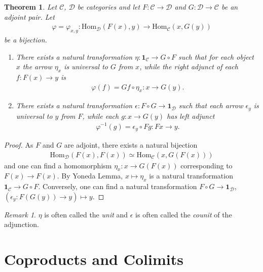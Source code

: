 \documentclass[12pt]{report}
\theoremstyle{plain}
\newtheorem{theorem}{Theorem}[section]
\theoremstyle{remark}
\newtheorem*{remark}{Remark}
\theoremstyle{definition}
\newcommand{\Hom}[3]{\mathrm{Hom}_{#3}(#1,#2)}
\begin{document}
\begin{theorem}
    Let $\mathcal{C}$, $\mathcal{D}$ be categories and let $F:\mathcal{C}\rightarrow\mathcal{D}$ and $G:\mathcal{D}\rightarrow\mathcal{C}$ be an adjoint pair. Let
    \begin{align*}
        \varphi=\varphi_{x,y}:\Hom{F(x)}{y}{\mathcal{D}}\rightarrow \Hom{x}{G(y)}{\mathcal{C}}
    \end{align*}
    be a bijection.
    \begin{enumerate}
        \item There exists a natural transformation $\eta:\mathbf{1}_\mathcal{C}\rightarrow G\circ F$ such that for each object $x$ the arrow $\eta_x$ is universal to $G$ from $x$, while the right adjunct of each $f:F(x)\rightarrow y$ is
        \begin{align*}
            \varphi(f) = Gf\circ \eta_x:x\rightarrow G(y).
        \end{align*}
        \item There exists a natural transformation $\epsilon:F\circ G\rightarrow \mathbf{1}_\mathcal{D}$ such that each arrow $\epsilon_y$ is universal to $y$ from $F$, while each $g:x\rightarrow G(y)$ has left adjunct
        \begin{align*}
            \varphi^{-1}(g)=\epsilon_y\circ Fg : Fx\rightarrow y.
        \end{align*}
    \end{enumerate}
\end{theorem}
\begin{proof}
    As $F$ and $G$ are adjoint, there exists a natural bijection
\begin{align*}
    \Hom{F(x)}{F(x)}{\mathcal{D}} \simeq \Hom{x}{G(F(x))}{\mathcal{C}}
\end{align*}
and one can find a homomorphism $\eta_x:x\rightarrow G(F(x))$ corresponding to $F(x)\rightarrow F(x)$. By Yoneda Lemma, $x\mapsto \eta_x$ is a natural transformation $\mathbf{1}_\mathcal{C}\rightarrow G\circ F$. Conversely, one can find a natural transformation $F\circ G\rightarrow \mathbf{1}_\mathcal{D}$, $(\epsilon_y:F(G(y))\rightarrow y)\mapsto y$.
\end{proof}
\begin{remark}
    $\eta$ is often called the \emph{unit} and $\epsilon$ is often called the \emph{counit} of the adjunction.
\end{remark}


\section{Coproducts and Colimits}
\end{document}
